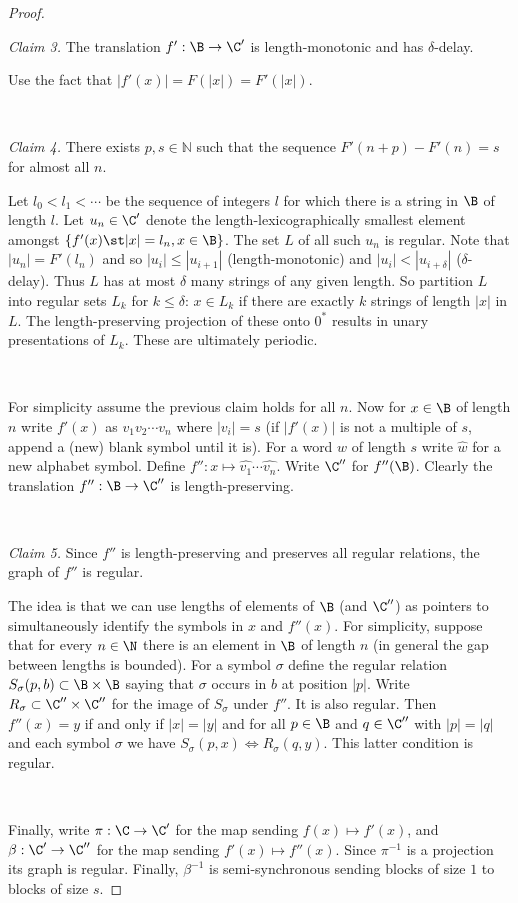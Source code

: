 \begin{proof}
\

\noindent
{\em Claim 3.} The translation $f':\B \to \C'$ is length-monotonic and has $\delta$-delay.

Use the fact that $|f'(x)| = F(|x|) = F'(|x|)$.

\

\noindent
{\em Claim 4.} There exists $p,s \in \mathbb{N}$ such that the sequence  $F'(n+p) - F'(n) = s$ for almost all $n$.

Let $l_0 < l_1 < \cdots$ be the sequence of integers $l$ for which there is a string in $\B$ of length $l$. Let 
$u_n \in \C'$ denote the length-lexicographically smallest element amongst $\{f'(x) \st |x| = l_n, x \in \B\}$.
The set $L$ of all such $u_n$ is regular. Note that $|u_n| = F'(l_n)$ and so $|u_i| \leq |u_{i+1}|$ (length-monotonic) and $|u_i| < |u_{i+\delta}|$ ($\delta$-delay).
Thus $L$ has at most $\delta$ many strings of any given length.
So partition $L$ into regular sets $L_k$ for $k \leq \delta$:  $x \in L_k$ if there are exactly $k$ strings of length $|x|$ in $L$. The length-preserving projection of these onto $0^\ast$ results in 
unary presentations of $L_k$. These are ultimately periodic.


\

For simplicity assume the previous claim holds for all $n$. Now for $x \in \B$ of length $n$ write $f'(x) $ as $v_1 v_2 \cdots v_n$ where $|v_i| = s$ (if $|f'(x)|$ is not a multiple of $s$, append
a (new) blank symbol until it is). For a word $w$ of length $s$ write $\widehat{w}$ for a new alphabet symbol. 
Define $f'':x \mapsto \widehat{v_1} \cdots \widehat{v_n}$. Write $\C''$ for $f''(\B)$. Clearly 
the translation $f'':\B \to \C''$ is length-preserving.

\

\noindent
{\em Claim 5.} Since $f''$ is length-preserving and preserves all regular relations, the graph of $f''$ is regular. 

The idea is that we can use lengths of elements of $\B$ (and $\C''$) as pointers to simultaneously identify the symbols in $x$ and $f''(x)$. For simplicity, suppose that for every $n \in \N$ there is an element in $\B$  of length $n$ (in general the gap between lengths is bounded). For a symbol $\sigma$ define the regular relation $S_\sigma(p,b) \subset \B \times \B$ saying that $\sigma$ occurs in $b$ at position $|p|$. Write $R_\sigma \subset \C'' \times \C''$ for the image of $S_\sigma$ under $f''$. It is also regular. Then $f''(x) = y$ if and only if $|x| = |y|$ and for all $p \in \B$
and $q \in \C''$ with $|p| = |q|$ and each symbol $\sigma$ we have $S_\sigma(p,x) \iff R_\sigma(q,y)$. This latter condition is regular.

\


Finally, write $\pi:\C \to \C'$ for the map sending $f(x) \mapsto f'(x)$, and $\beta:\C' \to \C''$ for the map sending $f'(x) \mapsto f''(x)$.
Since $\pi^{-1}$ is a projection its graph is regular.
Finally, $\beta^{-1}$ is semi-synchronous sending blocks of size $1$ to blocks of size $s$.
\end{proof}

